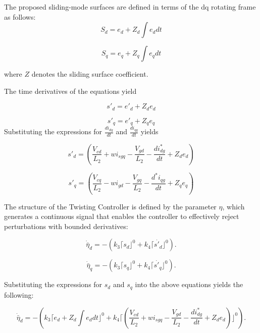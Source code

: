 \documentclass[preprint,12pt]{elsarticle}
\begin{document}
The proposed sliding-mode surfaces are defined in terms of the dq rotating frame as follows:
\begin{equation}
S_d = e_d + Z_d \int e_d dt
\end{equation}

\begin{equation}
S_q = e_q + Z_q \int e_q dt
\end{equation}

where \( Z \) denotes the sliding surface coefficient.

The time derivatives of the equations yield

\begin{equation}
s'_d = e'_d + Z_d e_d
\end{equation}

\begin{equation}
s'_q= e'_q + Z_q e_q
\end{equation}
Substituting the expressions for \( \frac{di_{dg}}{dt} \) and \( \frac{di_{qg}}{dt} \) yields

\begin{equation}
s'_d = \left(\frac{V_{cd}}{L_2} + w i_{sgq} - \frac{V_{gd}}{L_2} - \frac{di^*_{dg}}{dt} + Z_d e_d \right)
\end{equation}

\begin{equation}
s'_q =  \left(
\frac{V_{cq}}{L_2} - w i_{gd} - \frac{V_{gq}}{L_2} - \frac{d^*i_{qg}}{dt} + Z_q e_q
\right)
\end{equation}

The structure of the Twisting Controller \cite{torres2017design} is defined by the parameter \( \eta \), which generates a continuous signal that enables the controller to effectively reject perturbations with bounded derivatives:

\begin{equation}
    \dot{\bar{\eta}}_{d} = -\left( k_3 \lceil s_d \rfloor^0 + k_4 \lceil \dot{s'_d} \rfloor^0 \right).
\end{equation}

\begin{equation}
    \dot{\bar{\eta}}_{q} = -\left( k_3 \lceil s_q \rfloor^0 + k_4 \lceil \dot{s'_q} \rfloor^0 \right).
\end{equation}

Substituting the expressions for \(s_d\) and \(s_q\) into the above equations yields the following:

\begin{equation}
    \dot{\bar{\eta}}_{d} = -\left( k_3 \lceil e_d + Z_d \int e_d dt \rfloor^0 + k_4 \lceil \left(\frac{V_{cd}}{L_2} + w i_{sgq} - \frac{V_{gd}}{L_2} - \frac{di^*_{dg}}{dt} + Z_d e_d \right) \rfloor^0 \right).
\end{equation}
\end{document}
